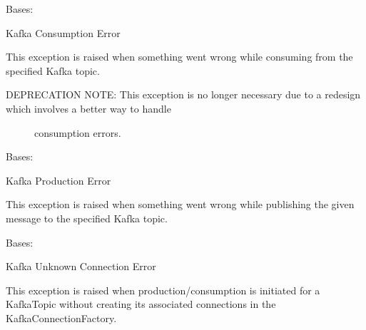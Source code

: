 \documentclass[letterpaper,10pt,english]{sphinxmanual}
\begin{document}
\begin{fulllineitems}
\label{\detokenize{Forge:Forge.KafkaConsumptionError}}
\sphinxAtStartPar
Bases: 

\sphinxAtStartPar
Kafka Consumption Error

\sphinxAtStartPar
This exception is raised when something went wrong while consuming from the specified Kafka topic.
\begin{description}
\item[{DEPRECATION NOTE: This exception is no longer necessary due to a re\sphinxhyphen{}design which involves a better way to handle}] \leavevmode
\sphinxAtStartPar
consumption errors.

\end{description}

\end{fulllineitems}


\begin{fulllineitems}
\label{\detokenize{Forge:Forge.KafkaProductionError}}
\sphinxAtStartPar
Bases: 

\sphinxAtStartPar
Kafka Production Error

\sphinxAtStartPar
This exception is raised when something went wrong while publishing the given message to the specified
Kafka topic.

\end{fulllineitems}


\begin{fulllineitems}
\label{\detokenize{Forge:Forge.KafkaUnknownConnectionError}}
\sphinxAtStartPar
Bases: 

\sphinxAtStartPar
Kafka Unknown Connection Error

\sphinxAtStartPar
This exception is raised when production/consumption is initiated for a KafkaTopic without creating its
associated connections in the KafkaConnectionFactory.

\end{fulllineitems}
\end{document}
